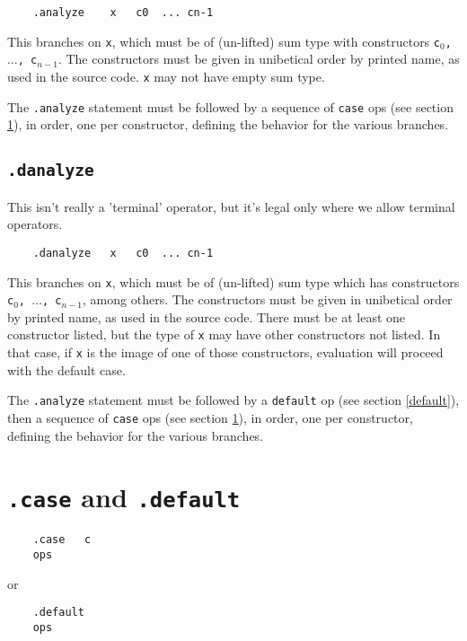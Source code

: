 \documentclass{report}
\newcommand\stringcode[1]{\texttt{#1}}
\begin{document}
\begin{verbatim}
	.analyze	x	c0	...	cn-1
\end{verbatim}

This branches on \stringcode{x}, which must be of (un-lifted) sum type with constructors \stringcode{c$_0$, $\ldots$, c$_{n-1}$}.
The constructors must be given in unibetical order by printed name, as used in the source code.
\stringcode{x} may  not have empty sum type.

The \stringcode{.analyze} statement must be followed by a sequence of \stringcode{case} ops (see section \ref{case}),
in order, one per constructor, defining the behavior for the various branches.

\subsection{\stringcode{.danalyze}}

This isn't really a 'terminal' operator, but it's legal only where we allow terminal operators.

\begin{verbatim}
	.danalyze	x	c0	...	cn-1
\end{verbatim}

This branches on \stringcode{x}, which must be of (un-lifted) sum type which has constructors \stringcode{c$_0$, $\ldots$, c$_{n-1}$},
among others.
The constructors must be given in unibetical order by printed name, as used in the source code.
There must be at least one constructor listed, but the type of \stringcode{x} may have other constructors not listed.
In that case, if \stringcode{x} is the image of one of those constructors, evaluation will proceed with the default case.

The \stringcode{.analyze} statement must be followed by a \stringcode{default} op (see section \ref{default}),
then a sequence of \stringcode{case} ops (see section \ref{case}),
in order, one per constructor, defining the behavior for the various branches.

\section{\stringcode{.case} and \stringcode{.default}}
\label{case}

\begin{verbatim}
	.case	c
	ops
\end{verbatim}
or
\begin{verbatim}
	.default
	ops
\end{verbatim}
\end{document}
